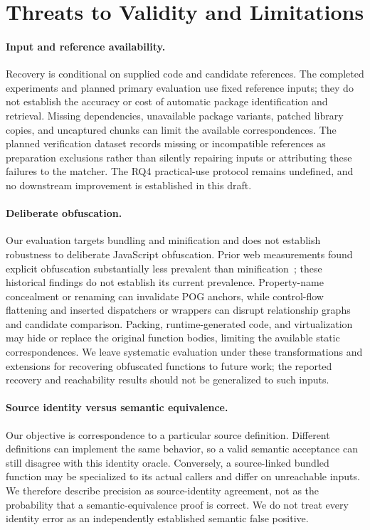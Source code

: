 \section{Threats to Validity and Limitations}
\label{sec:limitations}
\paragraph{Input and reference availability.}
Recovery is conditional on supplied code and candidate references. The completed experiments and planned primary evaluation use fixed reference inputs; they do not establish the accuracy or cost of automatic package identification and retrieval. Missing dependencies, unavailable package variants, patched library copies, and uncaptured chunks can limit the available correspondences. The planned verification dataset records missing or incompatible references as preparation exclusions rather than silently repairing inputs or attributing these failures to the matcher. The RQ4 practical-use protocol remains undefined, and no downstream improvement is established in this draft.

\paragraph{Deliberate obfuscation.}
Our evaluation targets bundling and minification and does not establish robustness to deliberate JavaScript obfuscation. Prior web measurements found explicit obfuscation substantially less prevalent than minification~\cite{skolka2019anything}; these historical findings do not establish its current prevalence. Property-name concealment or renaming can invalidate POG anchors, while control-flow flattening and inserted dispatchers or wrappers can disrupt relationship graphs and candidate comparison. Packing, runtime-generated code, and virtualization may hide or replace the original function bodies, limiting the available static correspondences. We leave systematic evaluation under these transformations and extensions for recovering obfuscated functions to future work; the reported recovery and reachability results should not be generalized to such inputs.

\paragraph{Source identity versus semantic equivalence.}
Our objective is correspondence to a particular source definition. Different definitions can implement the same behavior, so a valid semantic acceptance can still disagree with this identity oracle. Conversely, a source-linked bundled function may be specialized to its actual callers and differ on unreachable inputs. We therefore describe precision as source-identity agreement, not as the probability that a semantic-equivalence proof is correct. We do not treat every identity error as an independently established semantic false positive.

